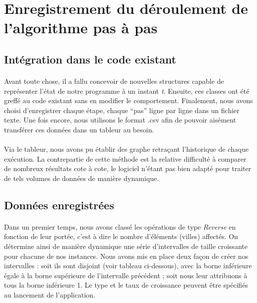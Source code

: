 \documentclass[a4paper,10pt]{report}
\begin{document}
\section{Enregistrement du déroulement de l'algorithme pas à pas}
\subsection{Intégration dans le code existant}

\paragraph{}
  Avant toute chose, il a fallu concevoir de nouvelles structures capable de représenter l'état de notre programme
à un instant \textit{t}. Ensuite, ces classes ont été greffé au code existant sans en modifier le comportement.
Finalement, nous avons choisi d'enregistrer chaque étape, chaque ``pas'' ligne par ligne dans un fichier texte.
Une fois encore, nous utilisons le format .csv afin de pouvoir aisément transférer ces données dans un tableur
au besoin.

\paragraph{}
  Via le tableur, nous avons pu établir des graphe retraçant l'historique de chaque exécution. La contrepartie de
cette méthode est la relative difficulté à comparer de nombreux résultats cote à cote, le logiciel n'étant pas
bien adapté pour traiter de tels volumes de données de manière dynamique.

\subsection{Données enregistrées}

\paragraph{}
  Dans un premier temps, nous avons classé les opérations de type \textit{Reverse} en fonction de leur portée,
c'est à dire le nombre d'éléments (villes) affectés. On détermine ainsi de manière dynamique une série
d'intervalles de taille croissante pour chacune de nos instances. Nous avons mis en place deux façon de créer
nos intervalles : soit ils sont disjoint (voir tableau ci-dessous), avec la borne inférieure égale à la borne
supérieure de l'intervalle précédent ; soit nous leur attribuons à tous la borne inférieure 1. Le type et le
taux de croissance peuvent être spécifiés au lancement de l'application.
\end{document}
